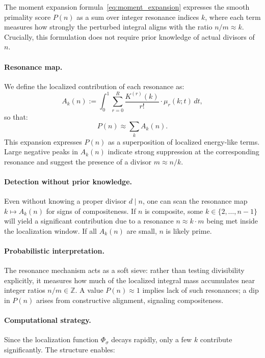 \documentclass[12pt]{article}
\theoremstyle{definition}
\theoremstyle{plain}
\theoremstyle{remark}
\begin{document}
The moment expansion formula~\eqref{eq:moment_expansion} expresses the smooth primality score \( P(n) \) as a sum over integer resonance indices \( k \), where each term measures how strongly the perturbed integral aligns with the ratio \( n/m \approx k \). Crucially, this formulation does not require prior knowledge of actual divisors of \( n \).

\paragraph{Resonance map.}
We define the localized contribution of each resonance as:
\[
A_k(n) := \int_0^1 \sum_{r=0}^{R} \frac{K^{(r)}(k)}{r!} \cdot \mu_r(k; t)\, dt,
\]
so that:
\[
P(n) \approx \sum_k A_k(n).
\]
This expansion expresses \( P(n) \) as a superposition of localized energy-like terms. Large negative peaks in \( A_k(n) \) indicate strong suppression at the corresponding resonance and suggest the presence of a divisor \( m \approx n/k \).

\paragraph{Detection without prior knowledge.}
Even without knowing a proper divisor \( d \mid n \), one can scan the resonance map \( k \mapsto A_k(n) \) for signs of compositeness. If \( n \) is composite, some \( k \in \{2, \dots, n-1\} \) will yield a significant contribution due to a resonance \( n \approx k \cdot m \) being met inside the localization window. If all \( A_k(n) \) are small, \( n \) is likely prime.

\paragraph{Probabilistic interpretation.}
The resonance mechanism acts as a soft sieve: rather than testing divisibility explicitly, it measures how much of the localized integral mass accumulates near integer ratios \( n/m \in \mathbb{Z} \). A value \( P(n) \approx 1 \) implies lack of such resonances; a dip in \( P(n) \) arises from constructive alignment, signaling compositeness.

\paragraph{Computational strategy.}
Since the localization function \( \Phi_\sigma \) decays rapidly, only a few \( k \) contribute significantly. The structure enables:
\end{document}
